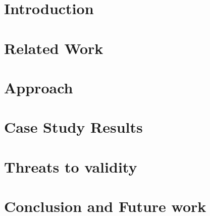 \documentclass[conference]{IEEEtran}
\begin{document}
\section{Introduction}
\label{sec:introduction}


\section{Related Work}
\label{sec:related_work}


\section{Approach}
\label{sec:approach}


\section{Case Study Results}
\label{sec:results}


\section{Threats to validity}
\label{sec:threats_to_validity}


\section{Conclusion and Future work}
\label{sec:conclusion}






% 
\end{document}
